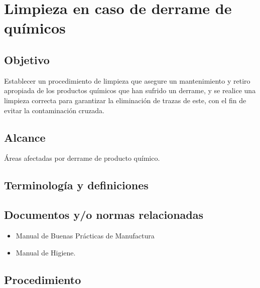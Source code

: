 \thispagestyle{formato-PI}
\renewcommand{\MenorVer}{0}
\renewcommand{\MayorVer}{2}
\renewcommand{\Codigo}{HYS-22-IT}
\renewcommand{\FechaPub}{2023--01}
\renewcommand{\Titulo}{Limpieza en caso de derrame de químicos}

\section{\Titulo}

\subsection{Objetivo}
Establecer un procedimiento de limpieza que asegure un mantenimiento y retiro apropiada de los productos químicos que han sufrido un derrame, y se realice una limpieza correcta para garantizar la eliminación de trazas de este, con el fin de evitar la contaminación cruzada.

\subsection{Alcance}
Áreas afectadas por derrame de producto químico.

\subsection{Terminología y definiciones}
\begin{description}
\end{description}

\subsection{Documentos y/o normas relacionadas}
\begin{itemize}
	\item Manual de Buenas Prácticas de Manufactura
	\item Manual de Higiene.
\end{itemize}

\subsection{Procedimiento}
